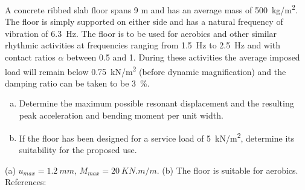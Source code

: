 
\begin{Exercise}[label={footfall_analysis}]
A concrete ribbed slab floor spans 9 m and has an average mass of \SI{500}{kg/m^2}. The floor is simply supported on either side and has a natural frequency of vibration of \SI{6.3}{Hz}. 
The floor is to be used for aerobics and other similar rhythmic activities at frequencies ranging from \SI{1.5}{Hz} to \SI{2.5}{Hz} and with contact ratios $\alpha$ between 0.5 and 1. During these activities the average imposed load will remain below \SI{0.75}{kN/m^2} (before dynamic magnification) and the damping ratio can be taken to be \SI{3}{\%}.

\begin{enumerate}[(a)]
    \item Determine the maximum possible resonant displacement and the resulting peak acceleration and bending moment per unit width.
    \item If the floor has been designed for a service load of \SI{5}{kN/m^2}, determine its suitability for the proposed use.
\end{enumerate}

\begin{center}
\hspace{1em}
\end{center}

\shortAnswer (a) $u_{max} = \SI{1.2}{mm}$, $M_{max} = \SI{20}{KN.m/m}$. (b) The floor is suitable for aerobics.\\
References: \cite{chopra}
\end{Exercise}



